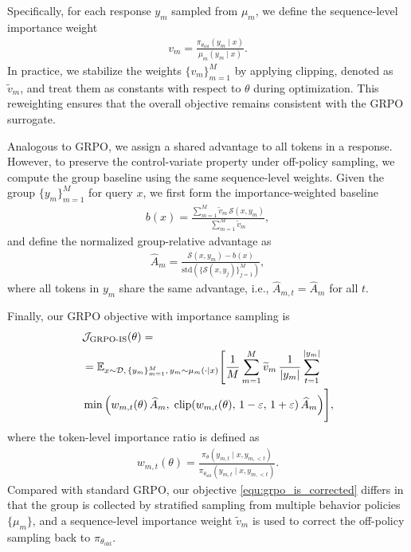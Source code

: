 Specifically, for each response $y_m$ sampled from $\mu_m$, we define the sequence-level importance weight
\begin{align*}
v_m = \frac{\pi_{\theta_\text{old}}(y_m \mid x)}{\mu_m(y_m \mid x)}.
\end{align*}
In practice, we stabilize the weights $\{v_m\}_{m=1}^M$ by applying clipping, denoted as $\widetilde{v}_m$, and treat them as constants with respect to $\theta$ during optimization.
This reweighting ensures that the overall objective remains consistent with the GRPO surrogate.

Analogous to GRPO, we assign a shared advantage to all tokens in a response.
However, to preserve the control-variate property under off-policy sampling, we compute the group baseline using the same sequence-level weights.
Given the group $\{y_m\}_{m=1}^M$ for query $x$, we first form the importance-weighted baseline
\begin{align*}
b(x)=\frac{\sum_{m=1}^{M} \widetilde{v}_m \, \mathcal{S}(x,y_m)}{\sum_{m=1}^{M} \widetilde{v}_m},
\end{align*}
and define the normalized group-relative advantage as
\begin{align*}
\widehat{A}_m
=
\frac{\mathcal{S}(x,y_m)-b(x)}
{\mathrm{std}\!\left(\{\mathcal{S}(x,y_j)\}_{j=1}^{M}\right)},
\end{align*}
where all tokens in $y_m$ share the same advantage, i.e., $\widehat{A}_{m,t}=\widehat{A}_m$ for all $t$.

Finally, our GRPO objective with importance sampling is
\begin{align}
\label{equ:grpo_is_corrected}
&\mathcal{J}_\text{GRPO-IS}(\theta)
= \notag \\
&=\mathbb{E}_{ x \sim \mathcal{D},\, \{y_m\}_{m=1}^M,\, y_m \sim \mu_m(\cdot \mid x) }
\Bigg[
\frac{1}{M}\sum_{m=1}^{M} \widetilde{v}_m\,
\frac{1}{|y_m|}\sum_{t=1}^{|y_m|}
\notag \\&\min \Big(
w_{m,t}(\theta)\, \widehat{A}_{m},\;
\mathrm{clip}\!\left( w_{m,t}(\theta),\, 1 - {\varepsilon},\, 1 + {\varepsilon}\right) \widehat{A}_{m}
\Big)
\Bigg],
\end{align}
where the token-level importance ratio is defined as
\begin{align*}
w_{m,t}(\theta)=\frac{ \pi_{\theta} (y_{m,t} \mid x, y_{m,<t}) }{ \pi_{\theta_\text{old}} (y_{m,t} \mid x, y_{m,<t}) }.
\end{align*}
Compared with standard GRPO, our objective \eqref{equ:grpo_is_corrected} differs in that the group is collected by stratified sampling from multiple behavior policies $\{\mu_m\}$, and a sequence-level importance weight $\widetilde{v}_m$ is used to correct the off-policy sampling back to $\pi_{\theta_\text{old}}$.

